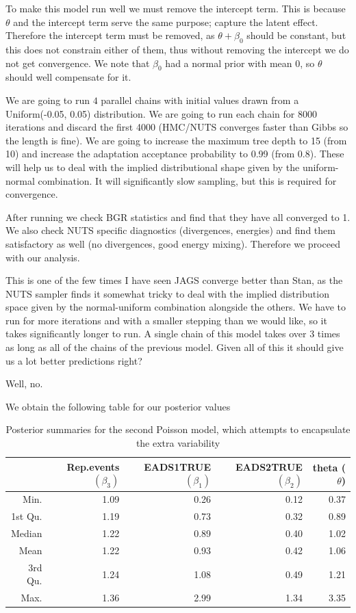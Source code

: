 \documentclass[10pt]{extarticle}
\begin{document}
To make this model run well we must remove the intercept term. This is because $\theta$ and the intercept term serve the same purpose; capture the latent effect. Therefore the intercept term must be removed, as $\theta + \beta_0$ should be constant, but this does not constrain either of them, thus without removing the intercept we do not get convergence. We note that $\beta_0$ had a normal prior with mean 0, so $\theta$ should well compensate for it.

We are going to run $4$ parallel chains with initial values drawn from a Uniform(-0.05, 0.05) distribution. We are going to run each chain for 8000 iterations and discard the first 4000 (HMC/NUTS converges faster than Gibbs so the length is fine). We are going to increase the maximum tree depth to 15 (from 10) and increase the adaptation acceptance probability to 0.99 (from 0.8). These will help us to deal with the implied distributional shape given by the uniform-normal combination. It will significantly slow sampling, but this is required for convergence.

After running we check BGR statistics and find that they have all converged to 1. We also check NUTS specific diagnostics (divergences, energies) and find them satisfactory as well (no divergences, good energy mixing). Therefore we proceed with our analysis.

This is one of the few times I have seen JAGS converge better than Stan, as the NUTS sampler finds it somewhat tricky to deal with the implied distribution space given by the normal-uniform combination alongside the others. We have to run for more iterations and with a smaller stepping than we would like, so it takes significantly longer to run. A single chain of this model takes over 3 times as long as all of the chains of the previous model. Given all of this it should give us a lot better predictions right?

Well, no.

We obtain the following table for our posterior values

\begin{table}[ht]
	\centering
	\begin{tabular}{rrrrr}
		\hline
		& Rep.events $(\beta_3)$ & EADS1TRUE $(\beta_1)$ & EADS2TRUE $(\beta_2)$ & theta ($\theta$) \\ 
		\hline
		Min. & 1.09 & 0.26 & 0.12 & 0.37 \\ 
		1st Qu. & 1.19 & 0.73 & 0.32 & 0.89 \\ 
		Median & 1.22 & 0.89 & 0.40 & 1.02 \\ 
		Mean & 1.22 & 0.93 & 0.42 & 1.06 \\ 
		3rd Qu. & 1.24 & 1.08 & 0.49 & 1.21 \\ 
		Max. & 1.36 & 2.99 & 1.34 & 3.35 \\ 
		\hline
	\end{tabular}
\caption{Posterior summaries for the second Poisson model, which attempts to encapsulate the extra variability}
\label{tab:postsum_poexv}
\end{table}
\end{document}
